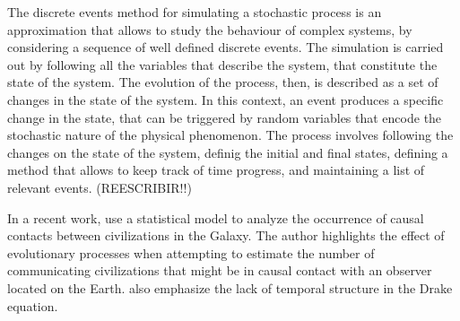 The discrete events method for simulating a stochastic process is an
approximation that allows to study the behaviour of complex systems,
by considering a sequence of well defined discrete events.
%
The simulation is carried out by following all the variables that
describe the system, that constitute the state of the system.
%
The evolution of the process, then, is described as a set of changes
in the state of the system.
%
In this context, an event produces a specific change in the state,
that can be triggered by random variables that encode the stochastic
nature of the physical phenomenon.
%
The process involves following the changes on the state of the system,
definig the initial and final states, defining a method that allows to
keep track of time progress, and maintaining a list of relevant
events. (REESCRIBIR!!)


In a recent work, \citep{balbi_impact_2018} use a statistical model to
analyze the occurrence of causal contacts between civilizations in the
Galaxy.
%
The author highlights the effect of evolutionary processes when
attempting to estimate the number of communicating civilizations that
might be in causal contact with an observer located on the Earth.
%
\citet{cirkovic_temporal_2004} also emphasize the lack of temporal
structure in the Drake equation.






